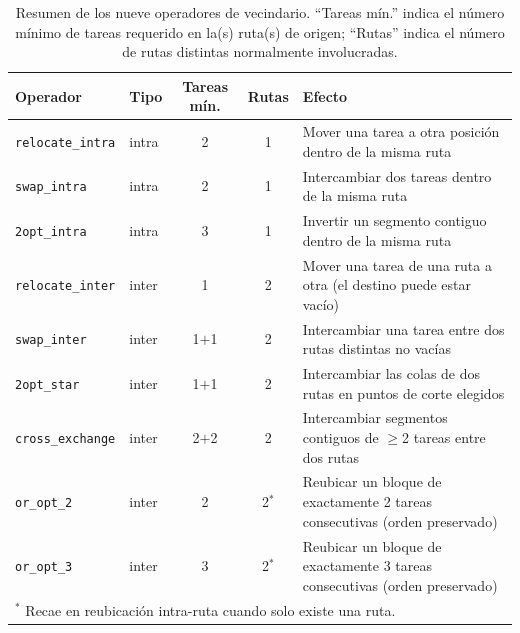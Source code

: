\begin{table}[h]
\centering
\renewcommand{\arraystretch}{1.4}
\begin{tabular}{llccp{5.2cm}}
\hline
\textbf{Operador} & \textbf{Tipo} & \textbf{Tareas mín.} & \textbf{Rutas} & \textbf{Efecto} \\
\hline
\texttt{relocate\_intra}  & intra & 2      & 1 & Mover una tarea a otra posición dentro de la misma ruta \\
\texttt{swap\_intra}      & intra & 2      & 1 & Intercambiar dos tareas dentro de la misma ruta \\
\texttt{2opt\_intra}      & intra & 3      & 1 & Invertir un segmento contiguo dentro de la misma ruta \\
\texttt{relocate\_inter}  & inter & 1      & 2 & Mover una tarea de una ruta a otra (el destino puede estar vacío) \\
\texttt{swap\_inter}      & inter & 1$+$1  & 2 & Intercambiar una tarea entre dos rutas distintas no vacías \\
\texttt{2opt\_star}       & inter & 1$+$1  & 2 & Intercambiar las colas de dos rutas en puntos de corte elegidos \\
\texttt{cross\_exchange}  & inter & 2$+$2  & 2 & Intercambiar segmentos contiguos de $\geq$2 tareas entre dos rutas \\
\texttt{or\_opt\_2}       & inter & 2      & 2$^*$ & Reubicar un bloque de exactamente 2 tareas consecutivas (orden preservado) \\
\texttt{or\_opt\_3}       & inter & 3      & 2$^*$ & Reubicar un bloque de exactamente 3 tareas consecutivas (orden preservado) \\
\hline
\multicolumn{5}{l}{$^*$ Recae en reubicación intra-ruta cuando solo existe una ruta.}
\end{tabular}
\caption{Resumen de los nueve operadores de vecindario.
         ``Tareas mín.'' indica el número mínimo de tareas requerido en la(s)
         ruta(s) de origen; ``Rutas'' indica el número de rutas distintas
         normalmente involucradas.}
\label{tab:operator-summary}
\end{table}
